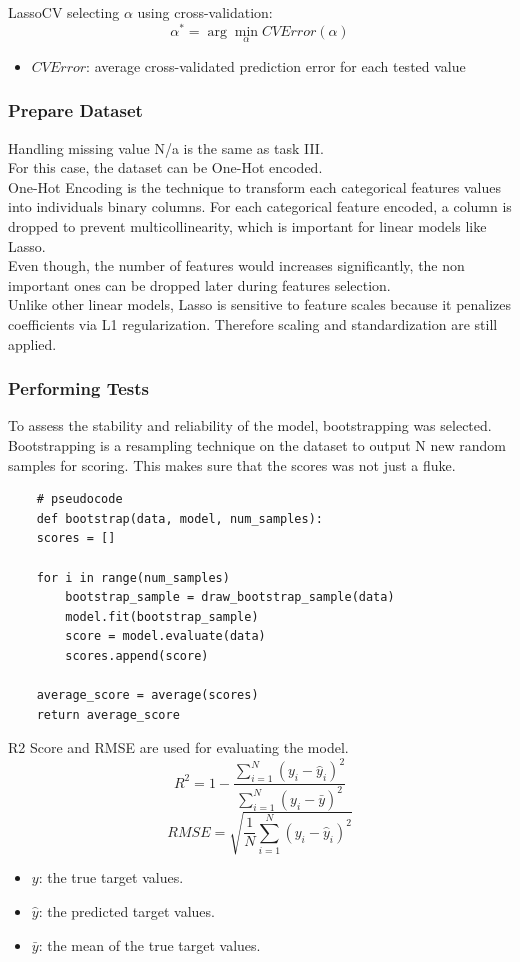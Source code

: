 \documentclass{report}
\begin{document}
LassoCV selecting $\alpha$ using cross-validation:
\[ \alpha^* = \arg\min_{\alpha} CVError(\alpha) \]
\begin{itemize}
    \item \( CVError \): average cross-validated prediction error for each tested value
\end{itemize}

\subsubsection{Prepare Dataset}
Handling missing value N/a is the same as task III. \\

\noindent
For this case, the dataset can be One-Hot encoded. \\
One-Hot Encoding is the technique to transform each categorical features values into individuals
binary columns. For each categorical feature encoded, a column is dropped to prevent multicollinearity,
which is important for linear models like Lasso. \\
Even though, the number of features would increases significantly, the non important ones can 
be dropped later during features selection. \\ 
Unlike other linear models, Lasso is sensitive to feature scales because it penalizes coefficients via 
L1 regularization. Therefore scaling and standardization are still applied.  

\subsubsection{Performing Tests}
To assess the stability and reliability of the model, bootstrapping was selected. Bootstrapping is a 
resampling technique on the dataset to output N new random samples for scoring. This makes sure that 
the scores was not just a fluke. \\
\begin{verbatim}
    # pseudocode
    def bootstrap(data, model, num_samples):
    scores = []
    
    for i in range(num_samples)
        bootstrap_sample = draw_bootstrap_sample(data)
        model.fit(bootstrap_sample)
        score = model.evaluate(data)
        scores.append(score)
    
    average_score = average(scores)
    return average_score
\end{verbatim}

\noindent
R2 Score and RMSE are used for evaluating the model.
\[ R^2 = 1 - \frac{\sum_{i=1}^{N} (y_i - \hat{y}_i)^2}{\sum_{i=1}^{N} (y_i - \bar{y})^2} \]
\[ RMSE = \sqrt{\frac{1}{N} \sum_{i=1}^{N} (y_i - \hat{y}_i)^2} \]
\begin{itemize}
    \item \( y \): the true target values.
    \item \( \hat{y} \): the predicted target values.
    \item \( \bar{y} \): the mean of the true target values.
\end{itemize}
\end{document}
